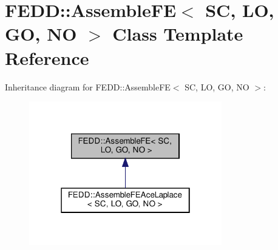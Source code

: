 \hypertarget{classFEDD_1_1AssembleFE}{}\section{F\+E\+DD\+:\+:Assemble\+FE$<$ SC, LO, GO, NO $>$ Class Template Reference}
\label{classFEDD_1_1AssembleFE}


Inheritance diagram for F\+E\+DD\+:\+:Assemble\+FE$<$ SC, LO, GO, NO $>$\+:\nopagebreak
\begin{figure}[H]
\begin{center}
\leavevmode
\includegraphics[width=238pt]{classFEDD_1_1AssembleFE__inherit__graph}
\end{center}
\end{figure}
